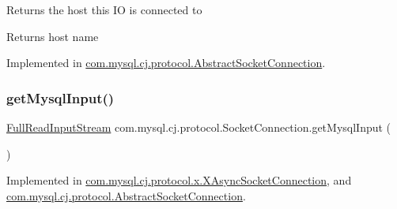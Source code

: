 Returns the host this IO is connected to

\begin{DoxyReturn}{Returns}
host name 
\end{DoxyReturn}


Implemented in \mbox{\hyperlink{classcom_1_1mysql_1_1cj_1_1protocol_1_1_abstract_socket_connection_a71d1b8dda2033fdf3c7a9715f0e64414}{com.\+mysql.\+cj.\+protocol.\+Abstract\+Socket\+Connection}}.

\mbox{\label{interfacecom_1_1mysql_1_1cj_1_1protocol_1_1_socket_connection_acf79ea4de0d3d0054db3ae5446f0319c}} 
\subsubsection{\texorpdfstring{get\+Mysql\+Input()}{getMysqlInput()}}
{\footnotesize\ttfamily \mbox{\hyperlink{classcom_1_1mysql_1_1cj_1_1protocol_1_1_full_read_input_stream}{Full\+Read\+Input\+Stream}} com.\+mysql.\+cj.\+protocol.\+Socket\+Connection.\+get\+Mysql\+Input (\begin{DoxyParamCaption}{ }\end{DoxyParamCaption})}



Implemented in \mbox{\hyperlink{classcom_1_1mysql_1_1cj_1_1protocol_1_1x_1_1_x_async_socket_connection_a780fb96617a64cb758ef75681f6dc3ab}{com.\+mysql.\+cj.\+protocol.\+x.\+X\+Async\+Socket\+Connection}}, and \mbox{\hyperlink{classcom_1_1mysql_1_1cj_1_1protocol_1_1_abstract_socket_connection_acb0fa6da1b08c40358e83dbc1e8867e7}{com.\+mysql.\+cj.\+protocol.\+Abstract\+Socket\+Connection}}.

\mbox{\label{interfacecom_1_1mysql_1_1cj_1_1protocol_1_1_socket_connection_ad71ae367a041cab45e32ec114c97a635}} 
